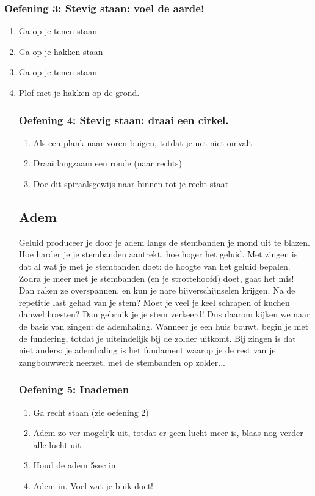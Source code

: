 \subsubsection*{Oefening 3: Stevig staan: voel de aarde!}
\begin{enumerate}
\item Ga op je tenen staan
\item Ga op je hakken staan
\item Ga op je tenen staan
\item Plof met je hakken op de grond.
\subsubsection*{Oefening 4: Stevig staan: draai een cirkel.}
\begin{enumerate}
\item Als een plank naar voren buigen, totdat je net niet omvalt
\item Draai langzaam een ronde (naar rechts)
\item Doe dit spiraalsgewijs naar binnen tot je recht staat
\end{enumerate}
\subsection*{Adem}
Geluid produceer je door je adem langs de stembanden je mond uit te blazen. Hoe harder je je stembanden aantrekt, hoe hoger het geluid. Met zingen is dat al wat je met je stembanden doet: de hoogte van het geluid bepalen. Zodra je meer met je stembanden (en je strottehoofd) doet, gaat het mis! Dan raken ze overspannen, en kun je nare bijverschijnselen krijgen. Na de repetitie last gehad van je stem? Moet je veel je keel schrapen of kuchen danwel hoesten? Dan gebruik je je stem verkeerd! Dus daarom kijken we naar de basis van zingen: de ademhaling. Wanneer je een huis bouwt, begin je met de fundering, totdat je uiteindelijk bij de zolder uitkomt. Bij zingen is dat niet anders: je ademhaling is het fundament waarop je de rest van je zangbouwwerk neerzet, met de stembanden op zolder...
\subsubsection*{Oefening 5: Inademen}
\begin{enumerate}
\item Ga recht staan (zie oefening 2)
\item Adem zo ver mogelijk uit, totdat er geen lucht meer is, blaas nog verder alle lucht uit.
\item Houd de adem 5sec in.
\item Adem in. Voel wat je buik doet!
\end{enumerate}

\end{enumerate}
